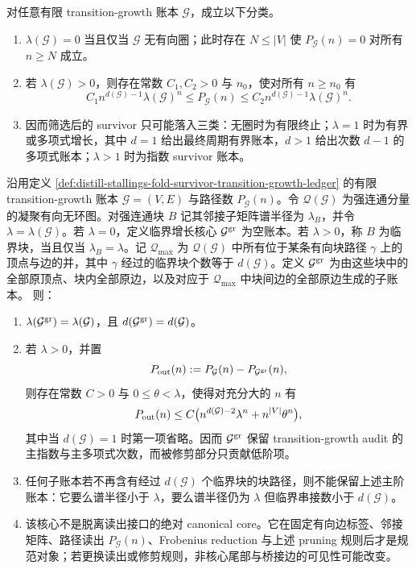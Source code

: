 \begin{proposition}\label{prop:distill-stallings-fold-survivor-transition-growth-ledger}
对任意有限 transition-growth 账本 \(\mathcal G\)，成立以下分类。
\begin{enumerate}
  \item \(\lambda(\mathcal G)=0\) 当且仅当 \(\mathcal G\) 无有向圈；此时存在 \(N\le |V|\) 使 \(P_{\mathcal G}(n)=0\) 对所有 \(n\ge N\) 成立。
  \item 若 \(\lambda(\mathcal G)>0\)，则存在常数 \(C_1,C_2>0\) 与 \(n_0\)，使对所有 \(n\ge n_0\) 有
  \[
  C_1 n^{d(\mathcal G)-1}\lambda(\mathcal G)^n
  \le P_{\mathcal G}(n)\le
  C_2 n^{d(\mathcal G)-1}\lambda(\mathcal G)^n.
  \]
  \item 因而筛选后的 survivor 只可能落入三类：无圈时为有限终止；\(\lambda=1\) 时为有界或多项式增长，其中 \(d=1\) 给出最终周期有界账本，\(d>1\) 给出次数 \(d-1\) 的多项式账本；\(\lambda>1\) 时为指数 survivor 账本。
\end{enumerate}
\end{proposition}
\begin{theorem}\label{distill:stallings_foldings_and_bestvina_handel_train_tracks-finite_descent_to_folded_core-transition-growth-critical-core-trimming}
沿用定义 \ref{def:distill-stallings-fold-survivor-transition-growth-ledger} 的有限
transition-growth 账本 \(\mathcal G=(V,E)\) 与路径数 \(P_{\mathcal G}(n)\)。令
\(\mathscr Q(\mathcal G)\) 为强连通分量的凝聚有向无环图。对强连通块 \(B\) 记其邻接子矩阵谱半径为
\(\lambda_B\)，并令 \(\lambda=\lambda(\mathcal G)\)。若 \(\lambda=0\)，定义临界增长核心
\(\mathcal G^{\rm gr}\) 为空账本。若 \(\lambda>0\)，称 \(B\) 为临界块，当且仅当
\(\lambda_B=\lambda\)。记 \(\mathscr Q_{\max}\) 为 \(\mathscr Q(\mathcal G)\) 中所有位于某条有向块路径
\(\gamma\) 上的顶点与边的并，其中 \(\gamma\) 经过的临界块个数等于
\(d(\mathcal G)\)。定义 \(\mathcal G^{\rm gr}\) 为由这些块中的全部原顶点、块内全部原边，以及对应于
\(\mathscr Q_{\max}\) 中块间边的全部原边生成的子账本。
则：
\begin{enumerate}
  \item \(\lambda(\mathcal G^{\rm gr})=\lambda(\mathcal G)\)，且
  \(d(\mathcal G^{\rm gr})=d(\mathcal G)\)。
  \item 若 \(\lambda>0\)，并置
  \[
  P_{\rm out}(n):=P_{\mathcal G}(n)-P_{\mathcal G^{\rm gr}}(n),
  \]
  则存在常数 \(C>0\) 与 \(0\le \theta<\lambda\)，使得对充分大的 \(n\) 有
  \[
  P_{\rm out}(n)\le
  C\bigl(n^{d(\mathcal G)-2}\lambda^n+n^{|V|}\theta^n\bigr),
  \]
  其中当 \(d(\mathcal G)=1\) 时第一项省略。因而 \(\mathcal G^{\rm gr}\) 保留
  transition-growth audit 的主指数与主多项式次数，而被修剪部分只贡献低阶项。
  \item 任何子账本若不再含有经过 \(d(\mathcal G)\) 个临界块的块路径，则不能保留上述主阶账本：它要么谱半径小于
  \(\lambda\)，要么谱半径仍为 \(\lambda\) 但临界串接数小于 \(d(\mathcal G)\)。
  \item 该核心不是脱离读出接口的绝对 canonical core。它在固定有向边标签、邻接矩阵、路径读出
  \(P_{\mathcal G}(n)\)、Frobenius reduction 与上述 pruning 规则后才是规范对象；若更换读出或修剪规则，非核心尾部与桥接边的可见性可能改变。
\end{enumerate}
\end{theorem}

